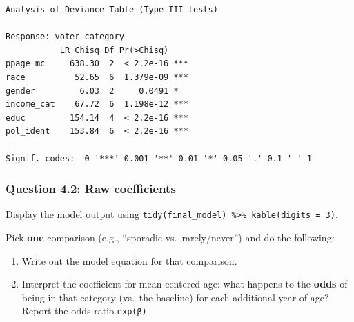 \documentclass[
  letterpaper,
  DIV=11,
  numbers=noendperiod]{scrartcl}
\providecommand{\tightlist}{%
  \setlength{\itemsep}{0pt}\setlength{\parskip}{0pt}}
\begin{document}
\begin{verbatim}
Analysis of Deviance Table (Type III tests)

Response: voter_category
           LR Chisq Df Pr(>Chisq)    
ppage_mc     638.30  2  < 2.2e-16 ***
race          52.65  6  1.379e-09 ***
gender         6.03  2     0.0491 *  
income_cat    67.72  6  1.198e-12 ***
educ         154.14  4  < 2.2e-16 ***
pol_ident    153.84  6  < 2.2e-16 ***
---
Signif. codes:  0 '***' 0.001 '**' 0.01 '*' 0.05 '.' 0.1 ' ' 1
\end{verbatim}

\subsubsection*{Question 4.2: Raw
coefficients}\label{question-4.2-raw-coefficients}

Display the model output using
\texttt{tidy(final\_model)\ \%\textgreater{}\%\ kable(digits\ =\ 3)}.

Pick \textbf{one} comparison (e.g., ``sporadic vs.~rarely/never'') and
do the following:

\begin{enumerate}
\def\labelenumi{\alph{enumi})}
\tightlist
\item
  Write out the model equation for that comparison.
\item
  Interpret the coefficient for mean-centered age: what happens to the
  \textbf{odds} of being in that category (vs.~the baseline) for each
  additional year of age? Report the odds ratio \texttt{exp(β)}.
\end{enumerate}
\end{document}
